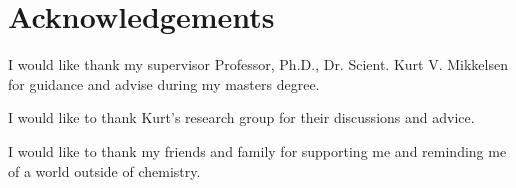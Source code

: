 \chapter*{Acknowledgements}
\label{chap:acknowl}

I would like thank my supervisor Professor,  Ph.D.,  Dr.  Scient. Kurt V. Mikkelsen for guidance and advise during my masters degree.

I would like to thank Kurt's research group for their discussions and advice.

I would like to thank my friends and family for supporting me and reminding me of a world outside of chemistry.
